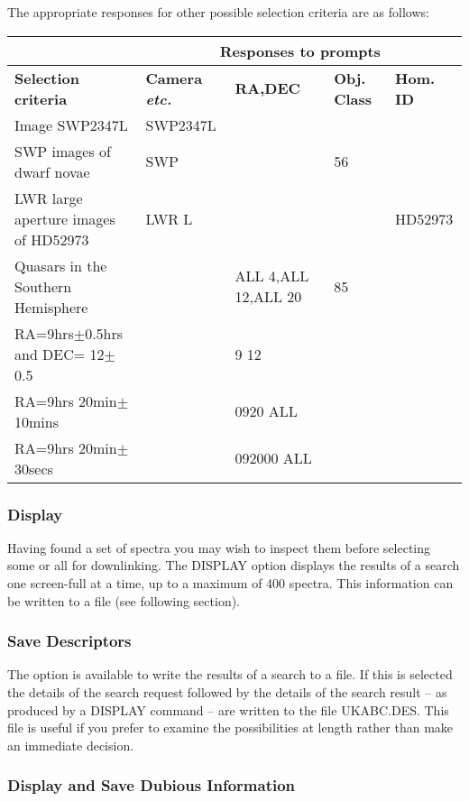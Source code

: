 \documentclass[11pt,nolof,noabs]{starlink}
\begin{document}
The appropriate responses for other possible selection criteria are as follows:

\footnotesize
\begin{center}
\begin{tabular}{|l|l|l|l|l|} \hline
\footnotesize
{}&\multicolumn{4}{c|}{\textbf{Responses to prompts}} \\ \hline
\textbf{Selection criteria}&\textbf{Camera \textit{etc.}}&\textbf{RA,DEC}&\textbf{Obj. Class}
&\textbf{Hom. ID}\\ \hline
Image SWP2347L &SWP2347L&&&\\
SWP images of dwarf novae &SWP&&56&\\
LWR large aperture images of HD52973&LWR L&&&HD52973\\
Quasars in the Southern Hemisphere&&ALL 4,ALL 12,ALL 20&85&\\
RA=9hrs$\pm$0.5hrs and DEC= 12$\pm$0.5&&9 12 &&\\
RA=9hrs 20min$\pm$10mins &&0920 ALL &&\\
RA=9hrs 20min$\pm$30secs &&092000 ALL &&\\ \hline
\end{tabular}
\end{center}

\normalsize
\subsubsection{Display}
Having found a set of spectra you may wish to inspect them before selecting
some or all for downlinking.
The DISPLAY option displays the results of a search one screen-full at a time,
up to a maximum of 400 spectra.
This information can be written to a file (see following section).

\subsubsection {Save Descriptors}

The option is available to write the results of a search to a file.
If this is selected the details
of the search request
followed by the details of the search result -- as produced by a DISPLAY
command -- are written to the file UKABC.DES.
This file is useful if you prefer to examine the possibilities at length
rather than make an immediate decision.

\subsubsection {Display and Save Dubious Information}
\end{document}
